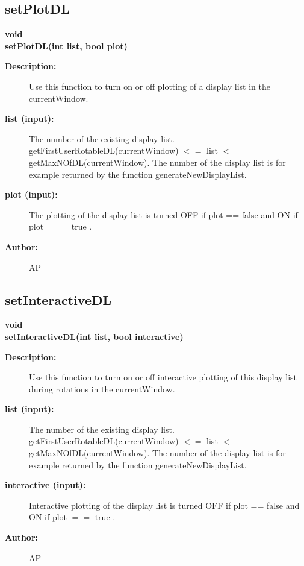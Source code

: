 \subsection{setPlotDL}
 
\begin{flushleft} \textbf{%
void  \\ 
\settowidth{\GLGraphicsInterfaceIncludeArgIndent}{setPlotDL(}%
setPlotDL(int list, bool plot)
}\end{flushleft}
\begin{description}
\item[{\bf Description:}] 
    Use this function to turn on or off plotting of a display list in the currentWindow.

\item[{\bf list (input):}] 
    The number of the existing display list. getFirstUserRotableDL(currentWindow) $<=$ list $<$ 
    getMaxNOfDL(currentWindow). The number of the display list is for example returned by the function
    generateNewDisplayList.
\item[{\bf plot (input):}] 
    The plotting of the display list is turned OFF if plot == false and ON if plot $==$ true .
\item[{\bf Author:}]  AP
\end{description}
\subsection{setInteractiveDL}
 
\begin{flushleft} \textbf{%
void  \\ 
\settowidth{\GLGraphicsInterfaceIncludeArgIndent}{setInteractiveDL(}%
setInteractiveDL(int list, bool interactive)
}\end{flushleft}
\begin{description}
\item[{\bf Description:}] 
    Use this function to turn on or off interactive plotting of this display list during rotations 
    in the currentWindow.

\item[{\bf list (input):}] 
    The number of the existing display list. getFirstUserRotableDL(currentWindow) $<=$ list $<$ 
    getMaxNOfDL(currentWindow). The number of the display list is for example returned by the function
    generateNewDisplayList.
\item[{\bf interactive (input):}] 
    Interactive plotting of the display list is turned OFF if plot == false and ON if plot $==$ true .
\item[{\bf Author:}]  AP
\end{description}
